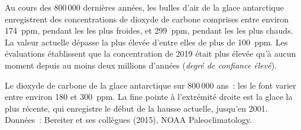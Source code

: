 \begin{proposition}\label{prop:g12:climate-change:icecore}
Au cours des 800\,000 dernières années, les bulles d'air de la glace
antarctique enregistrent des concentrations de dioxyde de carbone comprises
entre environ \qty{174}{ppm}, pendant les  les plus
froides, et \qty{299}{ppm}, pendant les  les plus chauds. La
valeur actuelle dépasse la plus élevée d'entre elles de plus de
\qty{100}{ppm}. Les évaluations établissent que la concentration de 2019
était plus élevée qu'à aucun moment depuis au moins deux millions d'années
(\emph{degré de confiance élevé}).
\end{proposition}

\begin{omfigure}

{\small Le dioxyde de carbone de la glace antarctique sur 800\,000 ans~:
les  le font varier entre environ 180 et \qty{300}{ppm}.
La fine pointe à l'extrémité droite est la glace la plus récente, qui
enregistre le début de la hausse actuelle, jusqu'en 2001. Données~:
Bereiter et ses collègues (2015), NOAA Paleoclimatology.}
\end{omfigure}

